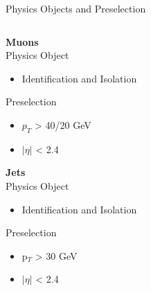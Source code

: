 \begin{frame}{Physics Objects and Preselection}
\begin{columns}
\begin{column}{0.4\textwidth}
  {\bf Muons}\\
  Physics Object
  \begin{itemize}
    \footnotesize
  \item
    Identification and Isolation
    \end{itemize}
  Preselection
  \begin{itemize}
  \item
    $p_{T}$ > 40/20 GeV
  \item
    $|\eta|$ < 2.4
  \end{itemize}
 {\bf Jets}\\
        Physics Object
        \begin{itemize}
        \item
          Identification and Isolation
        \end{itemize}
        
        Preselection
        \begin{itemize}
        \item
          p$_{T}$ > 30 GeV
        \item
          $|\eta|$ < 2.4
        \end{itemize}


  \end{column}
      
\end{columns}
\end{frame}

